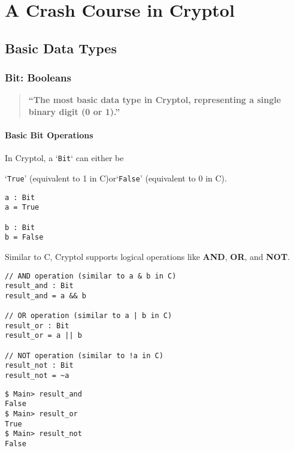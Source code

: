 \chapter{A Crash Course in Cryptol}


\section{Basic Data Types}

\subsection{Bit: Booleans}
\begin{quote}\bf
	``The most basic data type in Cryptol, representing a single binary digit (0 or 1).''
\end{quote}

\subsubsection{Basic Bit Operations}

\begin{tcolorbox}[colframe=defcolor,title={\color{white}\bf Data Type: \texttt{Bit}}]
In Cryptol, a `\texttt{Bit}` can either be \begin{center}
`\texttt{True}' (equivalent to 1 in C)\quad or\quad `\texttt{False}' (equivalent to 0 in C).
\end{center}
\end{tcolorbox}

\begin{lstlisting}[style=cryptol]
a : Bit
a = True

b : Bit
b = False
\end{lstlisting}

\noindent Similar to C, Cryptol supports logical operations like \textbf{AND}, \textbf{OR}, and \textbf{NOT}.
\begin{lstlisting}[style=cryptol]
// AND operation (similar to a & b in C)
result_and : Bit
result_and = a && b

// OR operation (similar to a | b in C)
result_or : Bit
result_or = a || b

// NOT operation (similar to !a in C)
result_not : Bit
result_not = ~a
\end{lstlisting}

\begin{lstlisting}[style=zsh]
$ Main> result_and
False
$ Main> result_or
True
$ Main> result_not
False 
\end{lstlisting}

